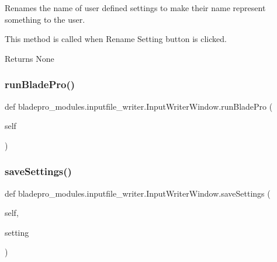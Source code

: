 Renames the name of user defined settings to make their name represent something to the user. 

This method is called when Rename Setting button is clicked.

\begin{DoxyReturn}{Returns}
None 
\end{DoxyReturn}
\hypertarget{classbladepro__modules_1_1inputfile__writer_1_1_input_writer_window_a4f95b1c85e601bde79e5d4e1a526ef8b}{}\label{classbladepro__modules_1_1inputfile__writer_1_1_input_writer_window_a4f95b1c85e601bde79e5d4e1a526ef8b} 
\subsubsection{\texorpdfstring{run\+Blade\+Pro()}{runBladePro()}}
{\footnotesize\ttfamily def bladepro\+\_\+modules.\+inputfile\+\_\+writer.\+Input\+Writer\+Window.\+run\+Blade\+Pro (\begin{DoxyParamCaption}\item[{}]{self }\end{DoxyParamCaption})}

\hypertarget{classbladepro__modules_1_1inputfile__writer_1_1_input_writer_window_a723573fade09f206a9c89569885558c1}{}\label{classbladepro__modules_1_1inputfile__writer_1_1_input_writer_window_a723573fade09f206a9c89569885558c1} 
\subsubsection{\texorpdfstring{save\+Settings()}{saveSettings()}}
{\footnotesize\ttfamily def bladepro\+\_\+modules.\+inputfile\+\_\+writer.\+Input\+Writer\+Window.\+save\+Settings (\begin{DoxyParamCaption}\item[{}]{self,  }\item[{}]{setting }\end{DoxyParamCaption})}




